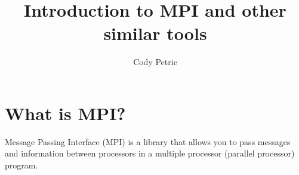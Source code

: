 \documentclass[12pt]{extarticle}
\title{Introduction to MPI and other similar tools}
\author{Cody Petrie}
\begin{document}
\maketitle

\section{What is MPI?}
Message Passing Interface (MPI) is a library that allows you to pass messages and information between processors in a multiple processor (parallel processor) program.
\end{document}
